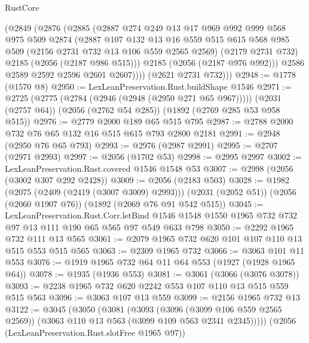 \begin{lexlean}{RustCore}
\begin{coremodule}
          (@2849
            (@2876
              (@2885
                (@2887
                  @274
                  @249
                  @13
                  @17
                  @969
                  @992
                  @999
                  @568
                  @975
                  @509
                  @2874
                  (@2887
                    @107
                    @132
                    @13
                    @16
                    @559
                    @515
                    @615
                    @568
                    @985
                    @509
                    (@2156 @2731 @732 @13 @106 @559 @2565 @2569)
                    (@2179 @2731 @732)
                    @2185
                    (@2056 (@2187 @986 @515)))
                  @2185
                  (@2056 (@2187 @976 @992)))
                @2586
                @2589
                @2592
                @2596
                @2601
                @2607))))
        (@2621 @2731 @732)))
@2948 := @1778 (@1570 @8)
@2950 := LexLeanPreservation.Rust.buildShape @1546
@2971 := @2725
    (@2775 (@2784 (@2946 (@2948 (@2950 @271 @65 @967)))))
    (@2031 (@2757 @64))
    (@2056 (@2762 @54 @285))
    (@1892 (@2769 @285 @53 @958 @515))
@2976 := @2779 @2000 @189 @65 @515 @795
@2987 := @2788 @2000 @732 @76 @65 @132 @16 @515 @615 @793 @2800 @2181
@2991 := @2948 (@2950 @76 @65 @793)
@2993 := @2976 (@2987 @2991)
@2995 := @2707 (@2971 @2993)
@2997 := @2056 (@1702 @53)
@2998 := @2995 @2997
@3002 := LexLeanPreservation.Rust.covered @1546 @1548 @53
@3007 := @2998 (@2056 (@3002 @307 @292 @2428))
@3009 := @2056 (@2183 @503)
@3028 := @1982
    (@2075 (@2409 (@2419 (@3007 @3009) @2993)))
    (@2031 (@2052 @51))
    (@2056 (@2060 @1907 @76))
    (@1892 (@2069 @76 @91 @542 @515))
@3045 := LexLeanPreservation.Rust.Corr.letBind
    @1546
    @1548
    @1550
    @1965
    @732
    @732
    @97
    @13
    @111
    @190
    @65
    @565
    @97
    @549
    @633
    @798
@3050 := @2292 @1965 @732 @111 @13 @565
@3061 := @2079 @1965 @732 @620 @101 @107 @110 @13 @515 @553 @515 @565
@3063 := @2309 @1965 @732
@3066 := @3063 @101 @11 @553
@3076 := @1919 @1965 @732 @64 @11 @64 @553 (@1927 (@1928 @1965 @64))
@3078 := @1935 (@1936 @553)
@3081 := @3061 (@3066 (@3076 @3078))
@3093 := @2238 @1965 @732 @620 @2242 @553 @107 @110 @13 @515 @559 @515 @563
@3096 := @3063 @107 @13 @559
@3099 := @2156 @1965 @732 @13
@3122 := @3045
    (@3050
      (@3081
        (@3093
          (@3096 (@3099 @106 @559 @2565 @2569))
          (@3063 @110 @13 @563 (@3099 @109 @563 @2341 @2345)))))
    (@2056 (LexLeanPreservation.Rust.slotFree @1965 @97))

\end{coremodule}
\end{lexlean}
